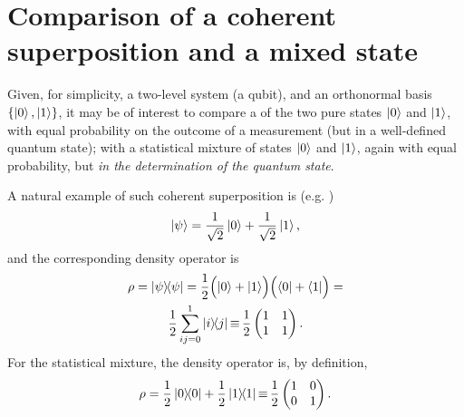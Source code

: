 \section{Comparison of a coherent superposition and a mixed state}
\label{sec:mix}

Given, for simplicity, a two-level system (a qubit), and an orthonormal basis
$\left\{\ket{0}, \ket{1}\right\}$, it may be of interest to compare a 
of the two pure states $\ket{0}$ and $\ket{1}$, with equal probability on the outcome of
a measurement (but in a well-defined quantum state); with a statistical mixture of
states $\ket{0}$ and $\ket{1}$, again with equal probability, but 
\emph{in the determination of the quantum state}.

A natural example of such coherent superposition is (e.g. \cite[Example 2.4]{Nakahara})
\[
  \ket{\psi} = \frac{1}{\sqrt{2}}\ket{0} + \frac{1}{\sqrt{2}}\ket{1}\text{,}
\]
and the corresponding density operator is
\begin{multline}\label{eq:matrix:pure}
  \rho = \ketbra{\psi}{\psi} =
  \frac{1}{2}\qty\Big(\ket{0} + \ket{1}) \qty\Big(\bra{0} + \bra{1}) =
  \\
  \frac{1}{2}\sum_{ij=0}^1\ketbra{i}{j} \operatorname*{\equiv}
  \frac{1}{2}
    \begin{pmatrix}
      1 &1  \\
      1 &1  \\
    \end{pmatrix}
  \text{.}
\end{multline}
For the statistical mixture, the density operator is, by definition,
\begin{equation}\label{eq:matrix:mix}
  \rho = \frac{1}{2}\ketbra{0}{0} + \frac{1}{2}\ketbra{1}{1} \operatorname*{\equiv}
  \frac{1}{2}
    \begin{pmatrix}
      1 &0  \\
      0 &1  \\
    \end{pmatrix}
  \text{.}
\end{equation}

